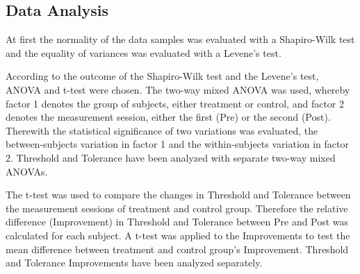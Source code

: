 \subsection{Data Analysis}

At first the normality of the data samples was evaluated with a Shapiro-Wilk test and the equality of variances was evaluated with a Levene's test. 

According to the outcome of the Shapiro-Wilk test and the Levene’s test, ANOVA and t-test were chosen. The two-way mixed ANOVA was used, whereby factor 1 denotes the group of subjects, either treatment or control, and factor 2 denotes the measurement session, either the first (Pre) or the second (Post). Therewith the statistical significance of two variations was evaluated, the between-subjects variation in factor 1 and the within-subjects variation in factor 2. \cite{Mooi2018} Threshold and Tolerance have been analyzed with separate two-way mixed ANOVAs.

The t-test was used to compare the changes in Threshold and Tolerance between the measurement sessions of treatment and control group. Therefore the relative difference (Improvement) in Threshold and Tolerance between Pre and Post was calculated for each subject. A t-test was applied to the Improvements to test the mean difference between treatment and control group’s Improvement. \cite{Mooi2018} Threshold and Tolerance Improvements have been analyzed separately.


